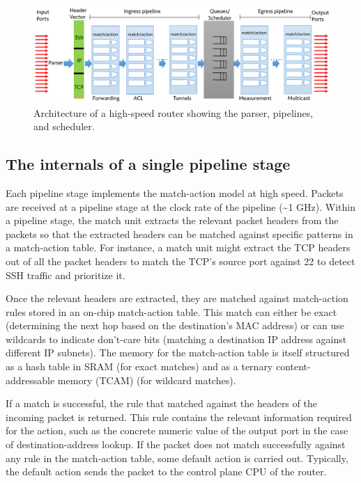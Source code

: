 \begin{figure}[!t]
\includegraphics[width=\textwidth]{detailed_pipeline.pdf}
\caption{Architecture of a high-speed router showing the parser, pipelines, and scheduler.}
\label{fig:detailed_pipeline}
\end{figure}

\subsection{The internals of a single pipeline stage} Each pipeline stage
implements the match-action model at high speed. Packets are received at a
pipeline stage at the clock rate of the pipeline (\textasciitilde1 GHz).
Within a pipeline stage, the match unit extracts the relevant packet headers
from the packets so that the extracted headers can be matched against specific
patterns in a match-action table. For instance, a match unit might extract the
TCP headers out of all the packet headers to match the TCP's source port
against 22 to detect SSH traffic and prioritize it.

Once the relevant headers are extracted, they are matched against match-action
rules stored in an on-chip match-action table. This match can either be exact
(\eg determining the next hop based on the destination's MAC address) or can
use wildcards to indicate don't-care bits (\eg matching a destination IP
address against different IP subnets). The memory for the match-action table is
itself structured as a hash table in SRAM (for exact matches) and as a ternary
content-addressable memory (TCAM) (for wildcard matches).

If a match is successful, the rule that matched against the headers of the
incoming packet is returned. This rule contains the relevant information
required for the action, such as the concrete numeric value of the output port
in the case of destination-address lookup. If the packet does not match
successfully against any rule in the match-action table, some default action is
carried out. Typically, the default action sends the packet to the control
plane CPU of the router.


